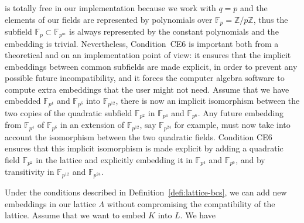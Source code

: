 is totally free in our implementation because we work with $q=p$ and the
elements of our fields are represented by polynomials over
$\mathbb{F}_p=\mathbb{Z}/p\mathbb{Z}$, thus the subfield
$\mathbb{F}_p\subset\mathbb{F}_{p^m}$ is always represented by the constant
polynomials and the embedding is trivial. Nevertheless, Condition~CE6 is
important both from a theoretical and on an implementation point of view: it
ensures that the implicit embeddings between common subfields are made explicit,
in order to prevent any possible future incompatibility, and it forces the
computer algebra software to compute extra embeddings that the user might not
need. Assume that we have embedded $\mathbb{F}_{p^4}$ and $\mathbb{F}_{p^6}$
into $\mathbb{F}_{p^{12}}$, there is now an implicit isomorphism between the two
copies of the quadratic subfield $\mathbb{F}_{p^2}$ in $\mathbb{F}_{p^4}$ and
$\mathbb{F}_{p^6}$. Any future embedding from $\mathbb{F}_{p^4}$ of
$\mathbb{F}_{p^6}$ in an extension of
$\mathbb{F}_{p^{12}}$, say $\mathbb{F}_{p^{24}}$ for example, must now take into
account the isomorphism between the two quadratic fields. Condition CE6 ensures
that this implicit isomorphism is made explicit by adding a quadratic field
$\mathbb{F}_{p^2}$ in the lattice and explicitly embedding it in
$\mathbb{F}_{p^4}$ and $\mathbb{F}_{p^6}$, and by transitivity in
$\mathbb{F}_{p^{12}}$ and $\mathbb{F}_{p^{24}}$.
\begin{center}
\end{center}
Under the conditions described in Definition~\ref{defi:lattice-bcs}, we
can add new embeddings in our lattice $\Lambda$ without compromising the
compatibility of the lattice. Assume that we want to embed $K$ into $L$. We have
